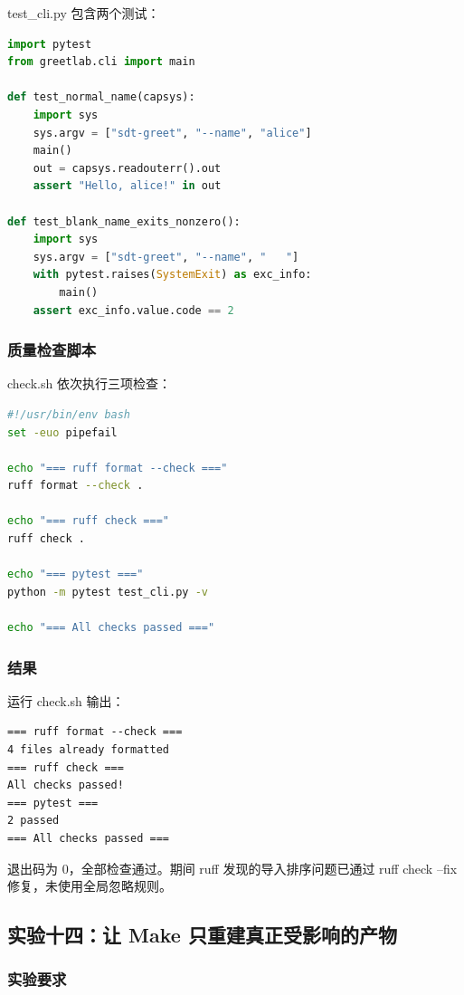 \documentclass[UTF8]{ctexart}
\begin{document}
test\_cli.py 包含两个测试：

\begin{lstlisting}[language=Python]
import pytest
from greetlab.cli import main

def test_normal_name(capsys):
    import sys
    sys.argv = ["sdt-greet", "--name", "alice"]
    main()
    out = capsys.readouterr().out
    assert "Hello, alice!" in out

def test_blank_name_exits_nonzero():
    import sys
    sys.argv = ["sdt-greet", "--name", "   "]
    with pytest.raises(SystemExit) as exc_info:
        main()
    assert exc_info.value.code == 2
\end{lstlisting}

\subsubsection{质量检查脚本}

check.sh 依次执行三项检查：

\begin{lstlisting}[language=bash]
#!/usr/bin/env bash
set -euo pipefail

echo "=== ruff format --check ==="
ruff format --check .

echo "=== ruff check ==="
ruff check .

echo "=== pytest ==="
python -m pytest test_cli.py -v

echo "=== All checks passed ==="
\end{lstlisting}

\subsubsection{结果}

运行 check.sh 输出：

\begin{lstlisting}
=== ruff format --check ===
4 files already formatted
=== ruff check ===
All checks passed!
=== pytest ===
2 passed
=== All checks passed ===
\end{lstlisting}

退出码为 0，全部检查通过。期间 ruff 发现的导入排序问题已通过 ruff check --fix 修复，未使用全局忽略规则。

\subsection{实验十四：让 Make 只重建真正受影响的产物}

\subsubsection{实验要求}
\end{document}
